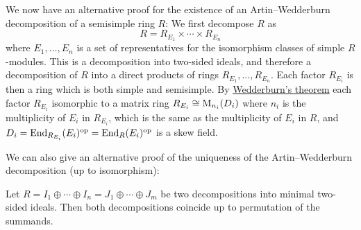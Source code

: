 \begin{fluff}
  We now have an alternative proof for the existence of an Artin--Wedderburn decomposition of a semisimple ring $R$:
  We first decompose $R$ as
  \[
      R
    = R_{E_1} \times \dotsb \times R_{E_n}
  \]
  where $E_1, \dotsc, E_n$ is a set of representatives for the isomorphism classes of simple $R$-modules.
  This is a decomposition into two-sided ideals, and therefore a decomposition of $R$ into a direct products of rings $R_{E_1}, \dotsc, R_{E_n}$.
  Each factor $R_{E_i}$ is then a ring which is both simple and semisimple.
  By \hyperref[theorem: wedderburns theorem]{Wedderburn’s theorem} each factor $R_{E_i}$ isomorphic to a matrix ring $R_{E_i} \cong \operatorname{M}_{n_i}(D_i)$ where $n_i$ is the multiplicity of $E_i$ in $R_{E_i}$, which is the same as the multiplicity of $E_i$ in $R$, and $D_i = \operatorname{End}_{R_{E_i}}(E_i)^{\operatorname{op}} = \operatorname{End}_R(E_i)^{\operatorname{op}}$ is a skew field.
  
  We can also give an alternative proof of the uniqueness of the Artin--Wedderburn decomposition (up to isomorphism):
\end{fluff}


\begin{lemma}
  \label{lemma: uniqueness of decompositon into simple rings}
  Let $R = I_1 \oplus \dotsb \oplus I_n = J_1 \oplus \dotsb \oplus J_m$ be two decompositions into minimal two-sided ideals.
  Then both decompositions coincide up to permutation of the summands.
\end{lemma}


